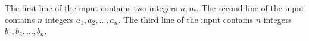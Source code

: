 The first line of the input contains two integers $n,m$.
The second line of the input contains $n$ integers $a_1,a_2,\ldots,a_n$.
The third line of the input contains $n$ integers $b_1,b_2,\ldots,b_n$.
